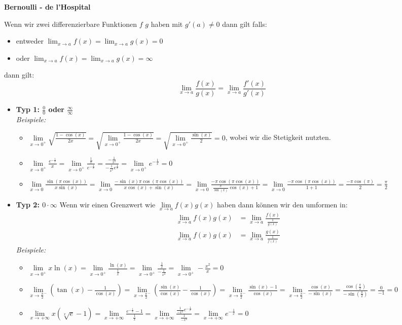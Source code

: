 \documentclass[25pt]{sciposter}
\newcommand{\limx}[1]{\lim\limits_{x \to #1}}
\newenvironment{method}[1]{\begin{mdframed}[backgroundcolor=blue!10,innertopmargin=15pt, innerbottommargin=15pt, nobreak=true]
		\textbf{#1 }
	}
	{ 
	\end{mdframed}
}
\begin{document}
\begin{multicols}{3}
\begin{method}{Bernoulli - de l’Hospital}
	Wenn wir zwei differenzierbare Funktionen $f$ $g$ haben mit $g'(a)\not = 0$ dann gilt falls:
	\begin{itemize}
		\item entweder $\lim_{x \to a} f(x) = \lim_{x \to a} g(x) = 0 $
		\item oder $\lim_{x \to a} f(x) = \lim_{x \to a} g(x) = \infty $
	\end{itemize}
dann gilt:
\begin{equation*}
	\lim_{x \to a} \frac{f(x)}{g(x)} = 	\lim_{x \to a} \frac{f'(x)}{g'(x)}
\end{equation*}
\end{method}
\begin{itemize}
	\item \textbf{Typ 1: $\frac{0}{0}$ oder $\frac{\infty}{\infty}$}\\
	\textit{Beispiele:}
	\begin{itemize}
		\item $\limx{0^+}\sqrt{\frac{1- \cos(x)}{2x}} = \sqrt{\limx{0^+}\frac{1- \cos(x)}{2x}} =  \sqrt{\limx{0^+}\frac{\sin(x)}{2}} = 0$, wobei wir die Stetigkeit nutzten.
		\item $\limx{0^+} \frac{e^{-\frac{1}{x}}}{x} = \limx{0^+} \frac{\frac{1}{x}}{e^{-\frac{1}{x}}} = \frac{-\frac{1}{x^2}}{-\frac{1}{x^2}e^{\frac{1}{x}}} = \limx{0^+} e^{- \frac{1}{x}} = 0$
		\item $\limx{0} \frac{\sin(\pi\cos(x))}{x\sin(x)} = \limx{0} \frac{-\sin(x)\pi\cos(\pi\cos(x))}{x\cos(x)+\sin(x)} = \limx{0} \frac{-\pi\cos(\pi\cos(x))}{\frac{x}{\sin(x)}\cos(x)+1} = \limx{0} \frac{-\pi\cos(\pi\cos(x))}{1+1} = \frac{-\pi\cos(\pi)}{2} = \frac{\pi}{2}$
	\end{itemize}
	\item \textbf{Typ 2: $0 \cdot \infty$} Wenn wir einen Grenzwert wie $\lim\limits_{x \to a} f(x)g(x)$ haben dann können wir den umformen in:
\begin{align*}
	\lim_{x \to a}f(x) g(x) &= \lim_{x\to a} \frac{f(x)}{\frac{1}{g(x)}}\\
		\lim_{x \to a}f(x) g(x) &= \lim_{x\to a} \frac{g(x)}{\frac{1}{f(x)}}
\end{align*}
\textit{Beispiele:}
\begin{itemize}
	\item $\limx{0^+} x\ln(x) = \limx{0^+} \frac{\ln(x)}{\frac{1}{x}} = \limx{0^+} \frac{\frac{1}{x}}{-\frac{1}{x^2}} = \limx{0^+} -\frac{x^2}{x} = 0$
	\item $\limx{\frac{\pi}{2}^-} \left( \tan(x) - \frac{1}{\cos(x)} \right) = \limx{\frac{\pi}{2}^-} \left(\frac{\sin(x)}{\cos(x)}- \frac{1}{\cos(x)} \right) = \limx{\frac{\pi}{2}^-} \frac{\sin(x) -1}{\cos(x)} = \limx{\frac{\pi}{2}^-} \frac{\cos(x)}{-\sin(x)} = \frac{\cos(\frac{\pi}{2})}{-\sin(\frac{\pi}{2})} = \frac{0}{-1} = 0$
	\item $\limx{+ \infty} x \left( \sqrt[x]{e} -1 \right) = \limx{+ \infty} \frac{e^{-\frac{1}{x}}-1}{\frac{1}{x}} = \limx{+ \infty} \frac{\frac{1}{-x^2}e^{-\frac{1}{x}}}{\frac{1}{-x^2}} = \limx{+ \infty} e^{-\frac{1}{x}} = 0$
\end{itemize}
	

\end{itemize}
\end{multicols}
\end{document}
